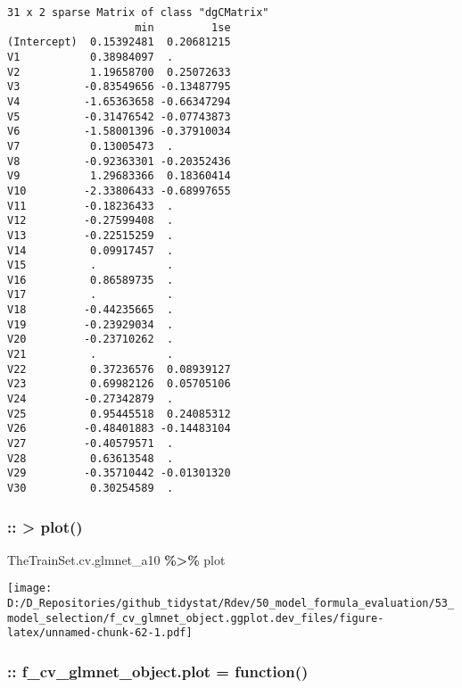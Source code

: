 \documentclass[
]{article}
\newenvironment{Shaded}{\begin{snugshade}}{\end{snugshade}}
\newcommand{\NormalTok}[1]{#1}
\newcommand{\SpecialCharTok}[1]{\textcolor[rgb]{0.81,0.36,0.00}{\textbf{#1}}}
\begin{document}
\begin{verbatim}
31 x 2 sparse Matrix of class "dgCMatrix"
                    min         1se
(Intercept)  0.15392481  0.20681215
V1           0.38984097  .         
V2           1.19658700  0.25072633
V3          -0.83549656 -0.13487795
V4          -1.65363658 -0.66347294
V5          -0.31476542 -0.07743873
V6          -1.58001396 -0.37910034
V7           0.13005473  .         
V8          -0.92363301 -0.20352436
V9           1.29683366  0.18360414
V10         -2.33806433 -0.68997655
V11         -0.18236433  .         
V12         -0.27599408  .         
V13         -0.22515259  .         
V14          0.09917457  .         
V15          .           .         
V16          0.86589735  .         
V17          .           .         
V18         -0.44235665  .         
V19         -0.23929034  .         
V20         -0.23710262  .         
V21          .           .         
V22          0.37236576  0.08939127
V23          0.69982126  0.05705106
V24         -0.27342879  .         
V25          0.95445518  0.24085312
V26         -0.48401883 -0.14483104
V27         -0.40579571  .         
V28          0.63613548  .         
V29         -0.35710442 -0.01301320
V30          0.30254589  .         
\end{verbatim}

\hypertarget{plot}{%
\subsubsection{:: \textbar\textgreater{} plot()}\label{plot}}

\begin{Shaded}
\begin{Highlighting}[]
\NormalTok{TheTrainSet.cv.glmnet\_a10 }\SpecialCharTok{\%\textgreater{}\%}\NormalTok{ plot}
\end{Highlighting}
\end{Shaded}

\texttt{[image: D:/D\_Repositories/github\_tidystat/Rdev/50\_model\_formula\_evaluation/53\_model\_selection/f\_cv\_glmnet\_object.ggplot.dev\_files/figure-latex/unnamed-chunk-62-1.pdf]}

\hypertarget{f_cv_glmnet_object.plot-function}{%
\subsubsection{:: f\_cv\_glmnet\_object.plot =
function()}\label{f_cv_glmnet_object.plot-function}}
\end{document}
